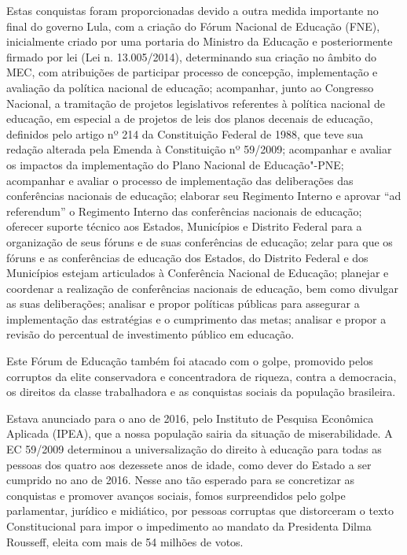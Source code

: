 Estas conquistas foram proporcionadas devido a outra medida importante
no final do governo Lula, com a criação do Fórum Nacional de Educação
(FNE), inicialmente criado por uma portaria do Ministro da Educação e
posteriormente firmado por lei (Lei n. 13.005/2014), determinando sua
criação no âmbito do MEC, com atribuições de participar processo de
concepção, implementação e avaliação da política nacional de educação;
acompanhar, junto ao Congresso Nacional, a tramitação de projetos
legislativos referentes à política nacional de educação, em especial a
de projetos de leis dos planos decenais de educação, definidos pelo
artigo nº 214 da Constituição Federal de 1988, que teve sua redação
alterada pela Emenda à Constituição nº 59/2009; acompanhar e avaliar os
impactos da implementação do Plano Nacional de Educação"-PNE; acompanhar
e avaliar o processo de implementação das deliberações das conferências
nacionais de educação; elaborar seu Regimento Interno e aprovar ``ad
referendum'' o Regimento Interno das conferências nacionais de educação;
oferecer suporte técnico aos Estados, Municípios e Distrito Federal para
a organização de seus fóruns e de suas conferências de educação; zelar
para que os fóruns e as conferências de educação dos Estados, do
Distrito Federal e dos Municípios estejam articulados à Conferência
Nacional de Educação; planejar e coordenar a realização de conferências
nacionais de educação, bem como divulgar as suas deliberações; analisar
e propor políticas públicas para assegurar a implementação das
estratégias e o cumprimento das metas;
analisar e propor a revisão do
percentual de investimento público em educação.

Este Fórum de Educação também foi atacado com o golpe, promovido pelos
corruptos da elite conservadora e concentradora de riqueza, contra a
democracia, os direitos da classe trabalhadora e as conquistas sociais
da população brasileira.

Estava anunciado para o ano de 2016, pelo Instituto de Pesquisa
Econômica Aplicada (IPEA), que a nossa população sairia da situação de
miserabilidade. A EC 59/2009 determinou a universalização do direito à
educação para todas as pessoas dos quatro aos dezessete anos de idade,
como dever do Estado a ser cumprido no ano de 2016. Nesse ano tão
esperado para se concretizar as conquistas e promover avanços sociais,
fomos surpreendidos pelo golpe parlamentar, jurídico e midiático, por
pessoas corruptas que distorceram o texto Constitucional para impor o
impedimento ao mandato da Presidenta Dilma Rousseff, eleita com mais de
54 milhões de votos.

